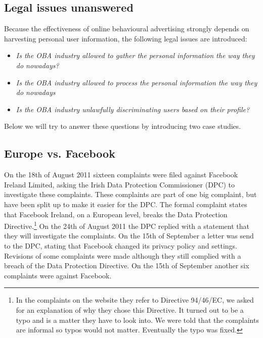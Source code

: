 \documentclass[11pt]{article}
\newcommand{\oba}{online behavioural advertising }
\begin{document}
\subsection{Legal issues unanswered}
\label{sec: legal questions}
Because the effectiveness of \oba strongly depends on harvesting personal user information, the following legal issues are introduced:\\

\begin{itemize}
	\item \textit{Is the OBA industry allowed to gather the personal information the way they do nowadays?}\\
	\item \textit{Is the OBA industry allowed to process the personal information the way they do nowadays}\\
	\item \textit{Is the OBA industry unlawfully discriminating users based on their profile?}\\
\end{itemize}

\noindent Below we will try to answer these questions by introducing two case studies.

\subsection{Europe vs. Facebook}
\label{sec: EU vs FB}
On the 18th of August 2011 sixteen complaints were filed against Facebook Ireland Limited, asking the Irish Data Protection Commissioner (DPC) to investigate these complaints. These complaints are part of one big complaint, but have been split up to make it easier for the DPC. The formal complaint states that Facebook Ireland, on a European level, breaks the Data Protection Directive.\footnote{In the complaints on the website they refer to Directive 94/46/EC, we asked for an explanation of why they chose this Directive. It turned out to be a typo and is a matter they have to look into. We were told that the complaints are informal so typos would not matter. Eventually the typo was fixed.}
On the 24th of August 2011 the DPC replied with a statement that they will investigate the complaints. On the 15th of September a letter was send to the DPC, stating that Facebook changed its privacy policy and settings. Revisions of some complaints were made although they still complied with a breach of the Data Protection Directive. On the 15th of September another six complaints were against Facebook.
\end{document}
